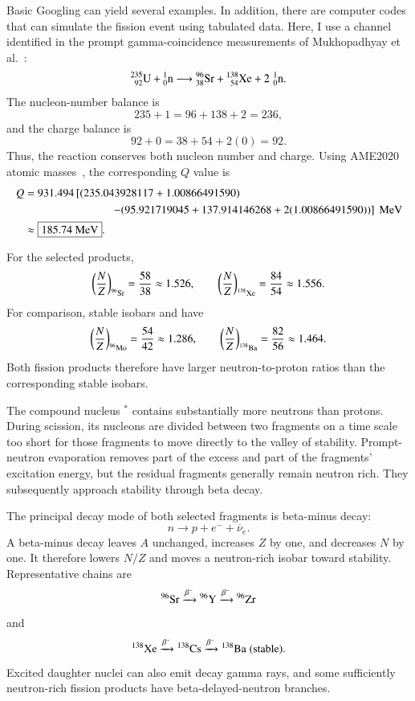 \begin{adaptedsolution}
Basic Googling can yield several examples.  In addition, there are computer
codes that can simulate the fission event using tabulated data.  Here, I use a
channel identified in the prompt gamma-coincidence measurements of
Mukhopadhyay et al.~\cite{mukhopadhyay2012}:
\[
 \isoAZ{U}{235}{92}+\isoAZ{n}{1}{0}
 \longrightarrow
 \isoAZ{Sr}{96}{38}+\isoAZ{Xe}{138}{54}
 +2\,\isoAZ{n}{1}{0}.
\]
The nucleon-number balance is
\[
 235+1=96+138+2=236,
\]
and the charge balance is
\[
 92+0=38+54+2(0)=92.
\]
Thus, the reaction conserves both nucleon number and charge.  Using AME2020
atomic masses~\cite{wang2021}, the corresponding $Q$ value is
\begin{align*}
 Q
 &=931.494\left[(235.043928117+1.00866491590)\right.\\
 &\hspace{2.7cm}\left.
 -(95.921719045+137.914146268+2(1.00866491590))\right]\ \mathrm{MeV}\\
 &\approx \boxed{185.74\ \mathrm{MeV}}.
\end{align*}

For the selected products,
\[
 \left(\frac{N}{Z}\right)_{\isoA{Sr}{96}}
 =\frac{58}{38}\approx1.526,
 \qquad
 \left(\frac{N}{Z}\right)_{\isoA{Xe}{138}}
 =\frac{84}{54}\approx1.556.
\]
For comparison, stable isobars  and  have
\[
 \left(\frac{N}{Z}\right)_{\isoA{Mo}{96}}
 =\frac{54}{42}\approx1.286,
 \qquad
 \left(\frac{N}{Z}\right)_{\isoA{Ba}{138}}
 =\frac{82}{56}\approx1.464.
\]
Both fission products therefore have larger neutron-to-proton ratios than the
corresponding stable isobars.

The compound nucleus $^*$ contains substantially more neutrons
than protons.  During scission, its nucleons are divided between two fragments
on a time scale too short for those fragments to move directly to the valley
of stability.  Prompt-neutron evaporation removes part of the excess and part
of the fragments' excitation energy, but the residual fragments generally
remain neutron rich.  They subsequently approach stability through beta decay.

The principal decay mode of both selected fragments is beta-minus decay:
\[
 n\longrightarrow p+e^-+\overline{\nu}_e.
\]
A beta-minus decay leaves $A$ unchanged, increases $Z$ by one, and decreases
$N$ by one.  It therefore lowers $N/Z$ and moves a neutron-rich isobar toward
stability.  Representative chains are
\[
 \isoA{Sr}{96}\xrightarrow{\beta^-}\isoA{Y}{96}
 \xrightarrow{\beta^-}\isoA{Zr}{96}
\]
and
\[
 \isoA{Xe}{138}\xrightarrow{\beta^-}\isoA{Cs}{138}
 \xrightarrow{\beta^-}\isoA{Ba}{138}\;(\text{stable}).
\]
Excited daughter nuclei can also emit decay gamma rays, and some sufficiently
neutron-rich fission products have beta-delayed-neutron branches.


\end{adaptedsolution}
